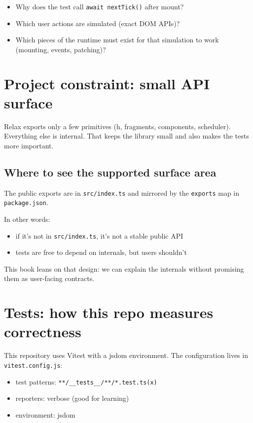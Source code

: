 \begin{itemize}
  \item Why does the test call \texttt{await nextTick()} after mount?
  \item Which user actions are simulated (exact DOM APIs)?
  \item Which pieces of the runtime must exist for that simulation to work (mounting, events, patching)?
\end{itemize}

\section{Project constraint: small API surface}
Relax exports only a few primitives (h, fragments, components, scheduler).
Everything else is internal. That keeps the library small and also makes the tests more important.

\subsection{Where to see the supported surface area}
The public exports are in \texttt{src/index.ts} and mirrored by the \texttt{exports} map in \texttt{package.json}.

In other words:

\begin{itemize}
  \item if it's not in \texttt{src/index.ts}, it's not a stable public API
  \item tests are free to depend on internals, but users shouldn't
\end{itemize}

This book leans on that design: we can explain the internals without promising them as user-facing contracts.

\section{Tests: how this repo measures correctness}
This repository uses Vitest with a jsdom environment.
The configuration lives in \texttt{vitest.config.js}:

\begin{itemize}
  \item test patterns: \texttt{**/\_\_tests\_\_/**/*.test.ts(x)}
  \item reporters: verbose (good for learning)
  \item environment: jsdom
\end{itemize}

